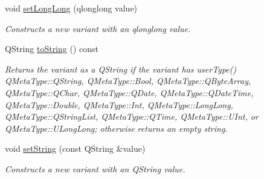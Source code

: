\begin{DoxyCompactItemize}
void \hyperlink{class_variant_a71259193b1023a8ef4761cc92b4c96b4}{set\+Long\+Long} (qlonglong value)
\begin{DoxyCompactList}\small\item\em Constructs a new variant with an qlonglong value. \end{DoxyCompactList}\item 
Q\+String \hyperlink{class_variant_a72d36925a5a47a1138a339cd4c4d3feb}{to\+String} () const
\begin{DoxyCompactList}\small\item\em Returns the variant as a Q\+String if the variant has user\+Type() Q\+Meta\+Type\+::\+Q\+String, Q\+Meta\+Type\+::\+Bool, Q\+Meta\+Type\+::\+Q\+Byte\+Array, Q\+Meta\+Type\+::\+Q\+Char, Q\+Meta\+Type\+::\+Q\+Date, Q\+Meta\+Type\+::\+Q\+Date\+Time, Q\+Meta\+Type\+::\+Double, Q\+Meta\+Type\+::\+Int, Q\+Meta\+Type\+::\+Long\+Long, Q\+Meta\+Type\+::\+Q\+String\+List, Q\+Meta\+Type\+::\+Q\+Time, Q\+Meta\+Type\+::\+U\+Int, or Q\+Meta\+Type\+::\+U\+Long\+Long; otherwise returns an empty string. \end{DoxyCompactList}\item 
void \hyperlink{class_variant_a16fb274754b40796aa8341456c53d53c}{set\+String} (const Q\+String \&value)
\begin{DoxyCompactList}\small\item\em Constructs a new variant with an Q\+String value. \end{DoxyCompactList}\end{DoxyCompactItemize}
